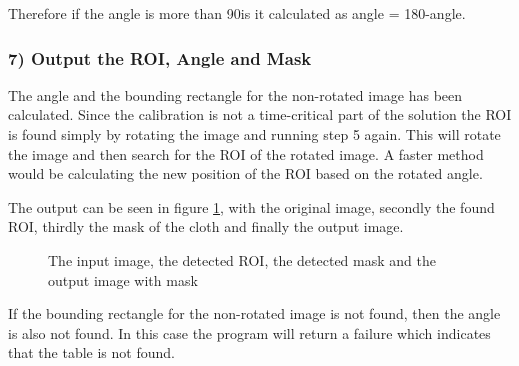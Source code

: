 Therefore if the angle is more than 90\degree is it calculated as angle = 180\degree-angle.

\subsubsection{7) Output the ROI, Angle and Mask}
The angle and the bounding rectangle for the non-rotated image has been calculated. Since the calibration is not a time-critical part of the solution the ROI is found simply by rotating the image and running step 5 again.  This will rotate the image and then search for the ROI of the rotated image. A faster method would be calculating the new position of the ROI based on the rotated angle.

The output can be seen in figure \ref{fig:tablelocateoutput}, with the original image, secondly the found ROI, thirdly the mask of the cloth and finally the output image.

\begin{figure}[htpb]
\centering
{}

\caption{The input image, the detected ROI, the detected mask and the output image with mask}
\label{fig:tablelocateoutput}
\end{figure}

If the bounding rectangle for the non-rotated image is not found, then the angle is also not found. In this case the program will return a failure which indicates that the table is not found.